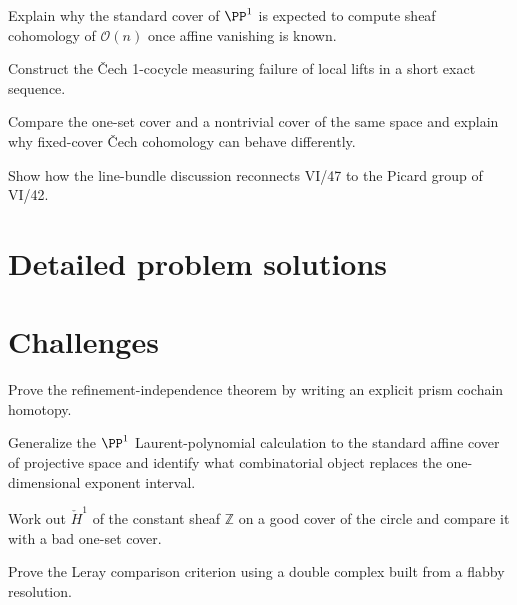 \begin{problem}\label{prob:vi47-09}
Explain why the standard cover of $\PP^1$ is expected to compute sheaf cohomology of $\mathcal O(n)$ once affine vanishing is known.
\end{problem}

\begin{problem}\label{prob:vi47-10}
Construct the Čech 1-cocycle measuring failure of local lifts in a short exact sequence.
\end{problem}

\begin{problem}\label{prob:vi47-11}
Compare the one-set cover and a nontrivial cover of the same space and explain why fixed-cover Čech cohomology can behave differently.
\end{problem}

\begin{problem}\label{prob:vi47-12}
Show how the line-bundle discussion reconnects VI/47 to the Picard group of VI/42.
\end{problem}

\ifdefined\FullProblemDossiers
\section{Detailed problem solutions}

\fi

\section{Challenges}
\begin{problem}[Challenge]\label{chal:vi47-01}
Prove the refinement-independence theorem by writing an explicit prism cochain homotopy.
\end{problem}

\begin{problem}[Challenge]\label{chal:vi47-02}
Generalize the $\PP^1$ Laurent-polynomial calculation to the standard affine cover of projective space and identify what combinatorial object replaces the one-dimensional exponent interval.
\end{problem}

\begin{problem}[Challenge]\label{chal:vi47-03}
Work out $\check H^1$ of the constant sheaf $\mathbb Z$ on a good cover of the circle and compare it with a bad one-set cover.
\end{problem}

\begin{problem}[Challenge]\label{chal:vi47-04}
Prove the Leray comparison criterion using a double complex built from a flabby resolution.
\end{problem}


